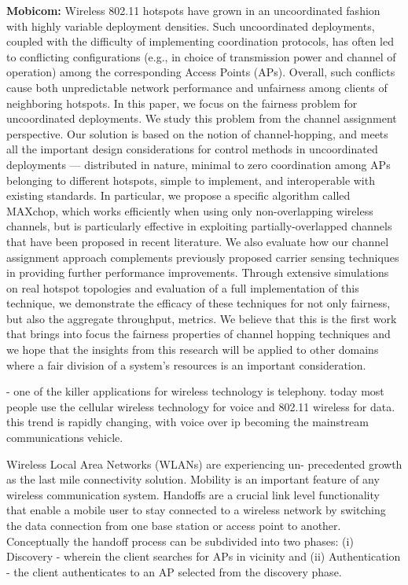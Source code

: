 \documentclass[11pt,letterpaper]{article}
\begin{document}
{\bf Mobicom:}
Wireless 802.11 hotspots have grown in an uncoordinated fashion
with highly variable deployment densities. Such uncoordinated
deployments, coupled with the difficulty of implementing
coordination protocols, has often led to conflicting configurations
(e.g., in choice of transmission power and channel of operation)
among the corresponding Access Points (APs). Overall, such conflicts
cause both unpredictable network performance and unfairness
among clients of neighboring hotspots. In this paper, we focus on
the fairness problem for uncoordinated deployments. We study
this problem from the channel assignment perspective. Our solution
is based on the notion of channel-hopping, and meets all
the important design considerations for control methods in uncoordinated
deployments — distributed in nature, minimal to zero
coordination among APs belonging to different hotspots, simple
to implement, and interoperable with existing standards. In particular,
we propose a specific algorithm called MAXchop, which
works efficiently when using only non-overlapping wireless channels,
but is particularly effective in exploiting partially-overlapped
channels that have been proposed in recent literature. We also
evaluate how our channel assignment approach complements previously
proposed carrier sensing techniques in providing further
performance improvements. Through extensive simulations on real
hotspot topologies and evaluation of a full implementation of this
technique, we demonstrate the efficacy of these techniques for not
only fairness, but also the aggregate throughput, metrics.
We believe that this is the first work that brings into focus the
fairness properties of channel hopping techniques and we hope that
the insights from this research will be applied to other domains
where a fair division of a system’s resources is an important consideration.


- one of the killer applications for wireless technology is telephony. today 
most people use the cellular wireless technology for voice and 802.11 wireless
for data. this trend is rapidly changing, with voice over ip becoming the mainstream
communications vehicle. 

Wireless Local Area Networks (WLANs) are experiencing un-
precedented growth as the last mile connectivity solution. Mobility is
an important feature of any wireless communication system. Handoffs
are a crucial link level functionality that enable a mobile user to stay
connected to a wireless network by switching the data connection from
one base station or access point to another. Conceptually the handoff
process can be subdivided into two phases: (i) Discovery - wherein the
client searches for APs in vicinity and (ii) Authentication - the client
authenticates to an AP selected from the discovery phase.
\end{document}
